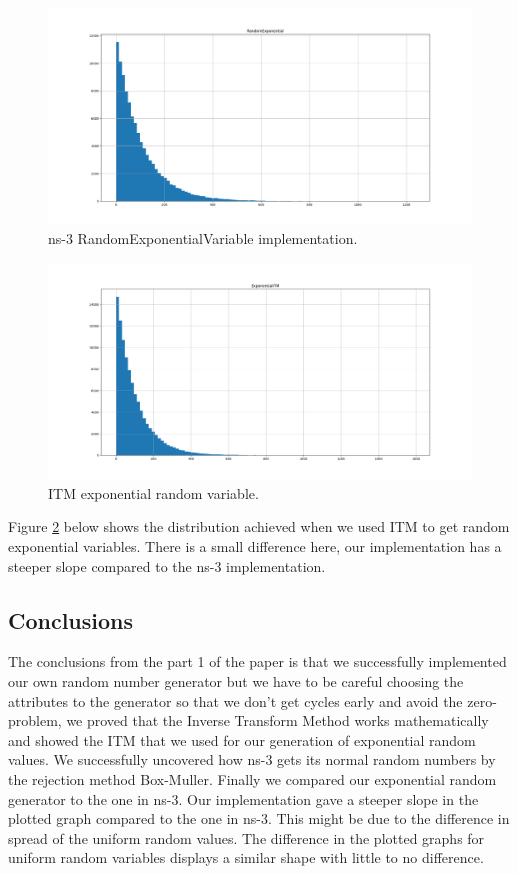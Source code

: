 \documentclass{article}
\begin{document}
  \begin{figure}[h!]
    \centering
      \includegraphics[width=\linewidth]{ns3exponential.png}
      \caption{ns-3 RandomExponentialVariable implementation.}
      \label{fig:ns-3rev}
  \end{figure}

  \begin{figure}[h!]
    \centering
      \includegraphics[width=\linewidth]{exponentialITM.png}
      \caption{ITM exponential random variable.}
      \label{fig:itmrev}
  \end{figure}
  \newpage
  
  Figure \ref{fig:itmrev} below shows the distribution achieved when we used ITM to get random exponential variables. 
  There is a small difference here, our implementation has a steeper slope compared to the ns-3 implementation.
  \newpage
  \subsection{Conclusions}
The conclusions from the part 1 of the paper is that we successfully implemented our own random number generator but we
have to be careful choosing the attributes to the generator so that we don't get cycles early and avoid the zero-problem, 
we proved that the Inverse Transform Method works mathematically and showed the ITM that we used for our generation 
of exponential random values. We successfully uncovered how ns-3 gets its normal random numbers by the rejection method
Box-Muller. Finally we compared our exponential random generator to the one in ns-3. Our implementation gave a steeper
slope in the plotted graph compared to the one in ns-3. This might be due to the difference in spread of the uniform
random values. The difference in the plotted graphs for uniform random variables displays a similar shape with little to
no difference.
\newpage
\end{document}
